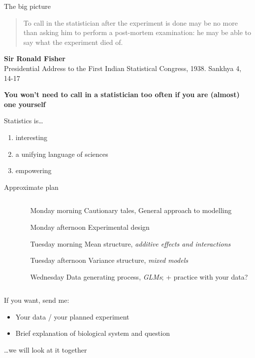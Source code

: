 \documentclass[10pt]{beamer}
\begin{document}
\begin{frame}{The big picture}
\begin{quote}
To call in the statistician after the experiment is done may be no more than asking him to perform a post-mortem examination: he may be able to say what the experiment died of.
\end{quote}
\textbf{Sir Ronald Fisher} \\ \footnotesize Presidential Address to the First Indian Statistical Congress, 1938. Sankhya 4, 14-17

\pause

\vfill
\textbf{You won't need to call in a statistician too often if you are (almost) one yourself}
\vfill

\pause 

\begin{exampleblock}{Statistics is\dots}
    \begin{enumerate}
     \item interesting
     \item a unifying language of sciences
     \item empowering 
    \end{enumerate}
\end{exampleblock}

\end{frame}

\begin{frame}{Approximate plan}
\begin{columns}
 \begin{column}{0.2\textwidth}
  
 \end{column}
 \begin{column}{0.8\textwidth}
 \begin{exampleblock}{}
    \begin{itemize}
     \item[Monday morning] Cautionary tales, General approach to modelling
     \item[Monday afternoon] Experimental design
     \item[Tuesday morning] Mean structure, \textit{additive effects and interactions}
     \item[Tuesday afternoon] Variance structure, \textit{mixed models}
     \item[Wednesday] Data generating process, \textit{GLMs}; + practice with your data?
    \end{itemize}
    \end{exampleblock}
    \end{column}
\end{columns}

If you want, send me:
\begin{itemize}
 \item Your data / your planned experiment
 \item Brief explanation of biological system and question
\end{itemize}
\hfill \dots we will look at it together

\end{frame}
\end{document}
